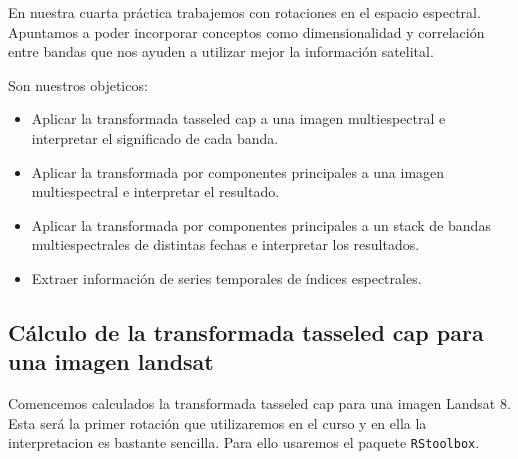 En nuestra cuarta pr\'actica trabajemos con rotaciones en el espacio espectral.
Apuntamos a poder incorporar conceptos como dimensionalidad y
correlaci\'on entre bandas que nos ayuden a utilizar mejor la informaci\'on
satelital.

Son nuestros objeticos:

\begin{itemize}
    \item Aplicar la transformada tasseled cap a una imagen multiespectral e
        interpretar el significado de cada banda.
    \item Aplicar la transformada por componentes principales a una imagen
        multiespectral e interpretar el resultado.
    \item Aplicar la transformada por componentes principales a un stack
        de bandas multiespectrales de distintas fechas e interpretar los resultados.
    \item Extraer informaci\'on de series temporales de \'indices espectrales.
\end{itemize}

\subsection{C\'alculo de la transformada tasseled cap para una imagen landsat}

Comencemos calculados la transformada tasseled cap para una imagen Landsat 8. Esta
ser\'a la primer rotaci\'on que utilizaremos en el curso y en ella la
interpretacion es bastante sencilla. Para ello usaremos el paquete
\texttt{RStoolbox}.

